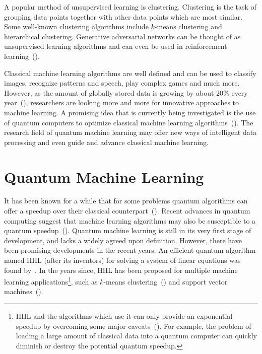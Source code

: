\documentclass[a4paper,10pt]{article}
\begin{document}
A popular method of unsupervised learning is clustering.
Clustering is the task of grouping data points together with other data points which are most similar.
Some well-known clustering algorithms include $k$-means clustering and hierarchical clustering.
Generative adversarial networks can be thought of as unsupervised learning algorithms and can even be used in reinforcement learning~(\cite{ho2016generative}).

Classical machine learning algorithms are well defined and can be used to classify images, recognize patterns and speech, play complex games and much more.
However, as the amount of globally stored data is growing by about 20\% every year~(\cite{hilbert2011world}), researchers are looking more and more for innovative approaches to machine learning.
A promising idea that is currently being investigated is the use of quantum computers to optimize classical machine learning algorithms~(\cite{schuld2015introduction}).
The research field of quantum machine learning may offer new ways of intelligent data processing and even guide and advance classical machine learning.

\section{Quantum Machine Learning} \label{sec:quantum-ml}
It has been known for a while that for some problems quantum algorithms can offer a speedup over their classical counterpart~(\cite{nielsen-chuang}).
Recent advances in quantum computing suggest that machine learning algorithms may also be susceptible to a quantum speedup~(\cite{lee2019experimental, lloyd2013quantum, gao2018quantum, yoo2014quantum}).
Quantum machine learning is still in its very first stage of development, and lacks a widely agreed upon definition.
However, there have been promising developments in the recent years.
An efficient quantum algorithm named HHL (after its inventors) for solving a system of linear equations was found by~\cite{harrow2009quantum}.
In the years since, HHL has been proposed for multiple machine learning applications\footnote{HHL and the algorithms which use it can only provide an exponential speedup by overcoming some major caveats~(\cite{aaronson2015read}). For example, the problem of loading a large amount of classical data into a quantum computer can quickly diminish or destroy the potential quantum speedup.}, such as $k$-means clustering~(\cite{lloyd2013quantum}) and support vector machines~(\cite{rebentrost2014quantum}).
\end{document}
